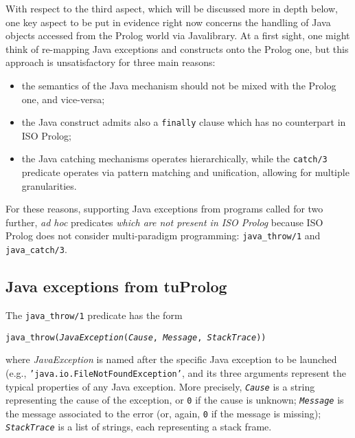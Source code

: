 With respect to the third aspect, which will be discussed more in depth below, one key aspect to
be put in evidence right now concerns the handling of Java objects accessed from the Prolog world
via Javalibrary. At a first sight, one might think of re-mapping Java exceptions and constructs
onto the Prolog one, but this approach is unsatisfactory for three main reasons:
\begin{itemize}
  \item the semantics of the Java mechanism should not be mixed with the Prolog one, and
      vice-versa;
  \item the Java construct admits also a \texttt{finally} clause which has no counterpart in
      ISO Prolog;
  \item the Java catching mechanisms operates hierarchically, while the \texttt{catch/3}
      predicate operates via pattern matching and unification, allowing for multiple
      granularities.
\end{itemize}
For these reasons, supporting Java exceptions from \tuprolog{} programs called for two further,
\textit{ad hoc} predicates \textit{which are not present in ISO Prolog} because ISO Prolog does
not consider multi-paradigm programming: \texttt{java\_throw/1} and \texttt{java\_catch/3}.

\subsection{Java exceptions from tuProlog}
\label{ssec:javathrow and javacatch}
The \texttt{java\_throw/1} predicate has the form
\medskip

 \texttt{java\_throw(\textit{JavaException}(\textit{Cause}, \textit{Message}, \textit{StackTrace}))}

\medskip
\noindent where \textit{JavaException} is named after the specific Java exception to be launched
(e.g., \texttt{'java.io.FileNotFoundException'}, and its three arguments represent the typical
properties of any Java exception. More precisely, \texttt{\textit{Cause}} is a string representing
the cause of the exception, or \texttt{0} if the cause is unknown; \texttt{\textit{Message}} is
the message associated to the error (or, again, \texttt{0} if the message is missing);
\texttt{\textit{StackTrace}} is a list of strings, each representing a stack frame.


